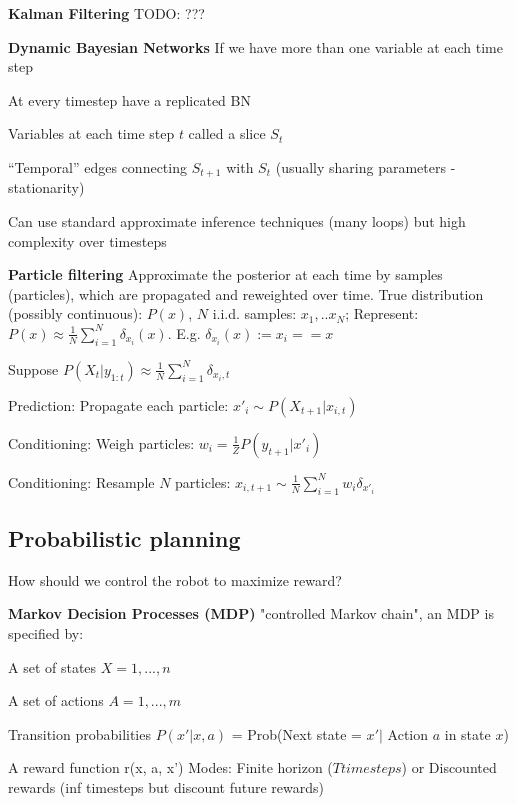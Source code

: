 \documentclass[a4paper, 11pt]{scrartcl}
\begin{document}
\begin{multicols*}{3}
\textbf{Kalman Filtering}
TODO: ???

\textbf{Dynamic Bayesian Networks}
If we have more than one variable at each time step
\begin{compactitem}
	\item At every timestep have a replicated BN
	\item Variables at each time step $t$ called a slice $S_t$
	\item “Temporal” edges connecting $S_{t+1}$ with $S_t$ (usually sharing parameters - stationarity)
	\item Can use standard approximate inference techniques (many loops) but high complexity over timesteps
\end{compactitem}


\textbf{Particle filtering}
Approximate the posterior at each time by samples (particles), which are propagated and reweighted over time.
True distribution (possibly continuous): $P(x)$, $N$ i.i.d. samples: $x_1,..x_N$; Represent: $P(x) \approx \frac{1}{N} \sum_{i=1}^{N} \delta_{x_i}(x)$. E.g. $\delta_{x_i}(x):= x_i == x$

\begin{compactitem}
	\item Suppose $P(X_t | y_{1:t}) \approx \frac{1}{N} \sum_{i=1}^{N} \delta_{x_i, t}$
	\item Prediction: Propagate each particle: $x'_i \sim P(X_{t+1} | x_{i,t})$
	\item Conditioning: Weigh particles: $w_i = \frac{1}{Z}P(y_{t+1} | x'_i)$
	\item Conditioning: Resample $N$ particles: $x_{i, t+1} \sim \frac{1}{N} \sum_{i=1}^{N} w_i\delta_{x'_i}$ 
\end{compactitem}

\subsection{Probabilistic planning}
How should we control the robot to maximize reward?

\textbf{Markov Decision Processes (MDP)}
"controlled Markov chain", an MDP is specified by:
\begin{compactitem}
	\item A set of states $X={1,...,n}$
	\item A set of actions $A={1,...,m}$
	\item Transition probabilities $P(x' | x, a)$ = Prob(Next state = $x' |$ Action $a$ in state $x$)
	\item A reward function r(x, a, x')
	Modes: Finite horizon ($T timesteps$) or Discounted rewards (inf timesteps but discount future rewards)
\end{compactitem}


\end{multicols*}
\end{document}
